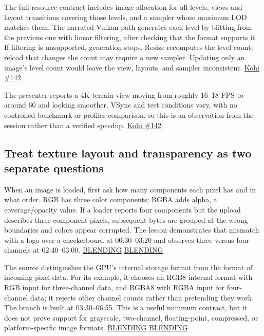 The full resource contract includes image allocation for all levels, views and layout transitions covering those levels, and a sampler whose maximum LOD matches them. The narrated Vulkan path generates each level by blitting from the previous one with linear filtering, after checking that the format supports it. If filtering is unsupported, generation stops. Resize recomputes the level count; reload that changes the count may require a new sampler. Updating only an image's level count would leave the view, layouts, and sampler inconsistent. \href{https://www.youtube.com/watch?v=xb23Y9o7tP4}{Kohi \#142}

The presenter reports a 4K terrain view moving from roughly 16--18 FPS to around 60 and looking smoother. VSync and test conditions vary, with no controlled benchmark or profiler comparison, so this is an observation from the session rather than a verified speedup. \href{https://www.youtube.com/watch?v=xb23Y9o7tP4}{Kohi \#142}

\subsection{Treat texture layout and transparency as two separate questions}\label{06-engine-ii-ch027-treat-texture-layout-and-transparency-as-two-separate-questions}

When an image is loaded, first ask how many components each pixel has and in what order. RGB has three color components; RGBA adds alpha, a coverage/opacity value. If a loader reports four components but the upload describes three-component pixels, subsequent bytes are grouped at the wrong boundaries and colors appear corrupted. The lesson demonstrates that mismatch with a logo over a checkerboard at 00:30--03:20 and observes three versus four channels at 02:40--03:00. \href{https://www.youtube.com/watch?v=N94fHNZEHas&t=30s}{BLENDING} \href{https://www.youtube.com/watch?v=N94fHNZEHas&t=160s}{BLENDING}

The source distinguishes the GPU's internal storage format from the format of incoming pixel data. For its example, it chooses an RGB8 internal format with RGB input for three-channel data, and RGBA8 with RGBA input for four-channel data; it rejects other channel counts rather than pretending they work. The branch is built at 03:30--06:55. This is a useful minimum contract, but it does not prove support for grayscale, two-channel, floating-point, compressed, or platform-specific image formats. \href{https://www.youtube.com/watch?v=N94fHNZEHas&t=210s}{BLENDING} \href{https://www.youtube.com/watch?v=N94fHNZEHas&t=390s}{BLENDING}

